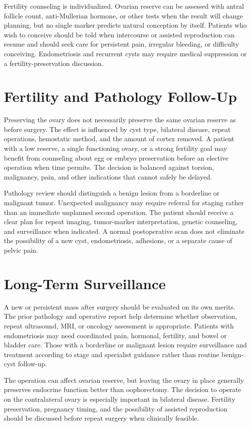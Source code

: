 Fertility counseling is individualized. Ovarian reserve can be assessed with antral follicle count, anti-Mullerian hormone, or other tests when the result will change planning, but no single marker predicts natural conception by itself. Patients who wish to conceive should be told when intercourse or assisted reproduction can resume and should seek care for persistent pain, irregular bleeding, or difficulty conceiving. Endometriosis and recurrent cysts may require medical suppression or a fertility-preservation discussion.

\section*{Fertility and Pathology Follow-Up}
Preserving the ovary does not necessarily preserve the same ovarian reserve as before surgery. The effect is influenced by cyst type, bilateral disease, repeat operations, hemostatic method, and the amount of cortex removed. A patient with a low reserve, a single functioning ovary, or a strong fertility goal may benefit from counseling about egg or embryo preservation before an elective operation when time permits. The decision is balanced against torsion, malignancy, pain, and other indications that cannot safely be delayed.

Pathology review should distinguish a benign lesion from a borderline or malignant tumor. Unexpected malignancy may require referral for staging rather than an immediate unplanned second operation. The patient should receive a clear plan for repeat imaging, tumor-marker interpretation, genetic counseling, and surveillance when indicated. A normal postoperative scan does not eliminate the possibility of a new cyst, endometriosis, adhesions, or a separate cause of pelvic pain.

\section*{Long-Term Surveillance}
A new or persistent mass after surgery should be evaluated on its own merits. The prior pathology and operative report help determine whether observation, repeat ultrasound, MRI, or oncology assessment is appropriate. Patients with endometriosis may need coordinated pain, hormonal, fertility, and bowel or bladder care. Those with a borderline or malignant lesion require surveillance and treatment according to stage and specialist guidance rather than routine benign-cyst follow-up.

The operation can affect ovarian reserve, but leaving the ovary in place generally preserves endocrine function better than oophorectomy. The decision to operate on the contralateral ovary is especially important in bilateral disease. Fertility preservation, pregnancy timing, and the possibility of assisted reproduction should be discussed before repeat surgery when clinically feasible.

